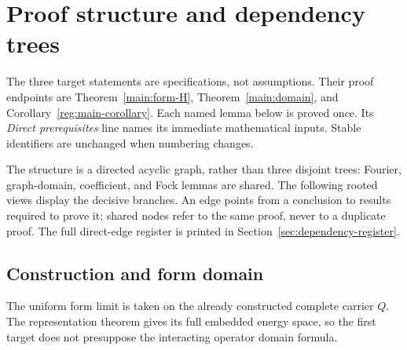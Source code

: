 \documentclass[11pt,a4paper]{article}
\theoremstyle{definition}
\theoremstyle{remark}
\begin{document}
\section{Proof structure and dependency trees}
\label{sec:architecture}
The three target statements are specifications, not assumptions. Their
proof endpoints are Theorem~\ref{main:form-H}, Theorem~\ref{main:domain},
and Corollary~\ref{reg:main-corollary}. Each named lemma below is proved
once. Its \emph{Direct prerequisites} line names its immediate mathematical
inputs. Stable identifiers are unchanged when numbering changes.

The structure is a directed acyclic graph, rather than three disjoint
trees: Fourier, graph-domain, coefficient, and Fock lemmas are shared.
The following rooted views display the decisive branches. An edge
points from a conclusion to results required to prove it; shared nodes
refer to the same proof, never to a duplicate proof. The full direct-edge
register is printed in Section~\ref{sec:dependency-register}.

\subsection{Construction and form domain}
\begin{center}
\end{center}
The uniform form limit is taken on the already constructed complete
carrier $Q$. The representation theorem gives its full embedded energy
space, so the first target does not presuppose the interacting operator
domain formula.
\end{document}
